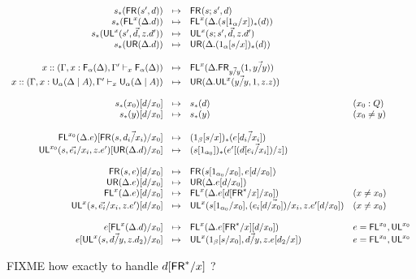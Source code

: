 \newcommand\redto{\mapsto}
\newcommand\Linv[2]{\Cut{#1}{\FR^*}{#2}}
\[
\begin{array}{rcll}
\Trd{s}{\FRd{}{s'}{\D}} & \redto & \FRd{}{s;s'}{\D}\\
\Trd{s}{\FLd{x}{\Delta.\D}} & \redto & \FLd{x}{\Delta.\Trd{(s[1_\alpha/x])}{\D}}\\
\Trd{s}{\ULd{x}{}{s'}{\vec{\D}}{z.\D'}} & \redto & {\ULd{x}{}{s;s'}{\vec{\D}}{z.\D'}}\\
\Trd{s}{\URd{\Delta.\D}} & \redto & \URd{\Delta.\Trd{(1_\alpha[s/x])}{\D}} \\
\\
x :: (\seq{\Gamma,x:\F{\alpha}{\Delta},\Gamma'}{x}{\F{\alpha}{\Delta}}) & \redto & \FLd{x}{\Delta.\FRd{\vec{y/y}}{1}{\vec{y/y}}}\\
x :: (\seq{\Gamma,x:\U{\alpha}{\Delta}{A},\Gamma'}{x}{\U{\alpha}{\Delta}{A}}) & \redto & \URd{\Delta.\ULd{x}{}{\vec{y/y}}{1}{z.z}} \\
\\
\Cut{\Trd{s}{x_0}}{d}{x_0} & \redto & \Trd{s}{d} & (x_0 : Q)\\
\Cut{\Trd{s}{y}}{d}{x_0} & \redto & \Trd{s}{y} & (x_0 \neq y)\\
\\
\Cut{\FLd{x_0}{\Delta.\E}}{\FRd{}{s}{\vec{\D_i/x_i}}}{x_0} & \redto & \Trd{(1_\beta[s/x])}{\E[\vec{\D_i/x_i}]} \\
\Cut{\ULd{x_0}{}{s}{\vec{\E_i}/x_i}{z.\E'}}{\URd{\Delta.\D}}{x_0} & \redto & \Trd{(s[1_{\alpha_0}])}{\Cut{\E'}{(\D[{\vec{\E_i/x_i}}])}{z}} &  \\
\\
\Cut{\FRd{}{s}{\E}}{\D}{x_0} & \redto & {\FRd{}{s[1_{\alpha_0}/x_0]}{\Cut{\E}{\D}{x_0}}}\\
\Cut{\URd{\Delta.\E}}{\D}{x_0} & \redto & \URd{\Delta.\subst{\E}{\D}{x_0}}\\
\Cut{\FLd{x}{\Delta.\E}}{\D}{x_0} & \redto & \FLd{x}{\Delta.\Cut{\E}{\Linv{\D}{x}}{x_0}} & (x \neq x_0) \\%
\Cut{\ULd{x}{}{s}{\vec{\E_i}/x_i}{z.\E'}}{\D}{x_0} & \redto & {\ULd{x}{}{s[1_{\alpha_0}/x_0]}{\vec{(\Cut{\E_i}{\D}{x_0})/x_i}}{z.\Cut{\E'}{\D}{x_0}}} & (x \neq x_0)\\%
\\
\Cut{\E}{\FLd{x}{\Delta.\D}}{x_0} & \redto & \FLd{x}{\Delta.\Cut{\Linv{\E}{x}}{\D}{x_0}} & \E = \FL^{x_0},\UL^{x_0}\\%
\Cut{\E}{\ULd{x}{}{s}{\vec{\D/y}}{z.\D_2}}{x_0} & \redto & \ULd{x}{}{1_\beta[s/x_0]}{\vec{\D/y}}{z.\Cut{\E}{\D_2}{x}} & \E = \FL^{x_0},\UL^{x_0} \\%
\end{array}
\]

FIXME how exactly to handle $\Linv{\D}{x}$ ?
